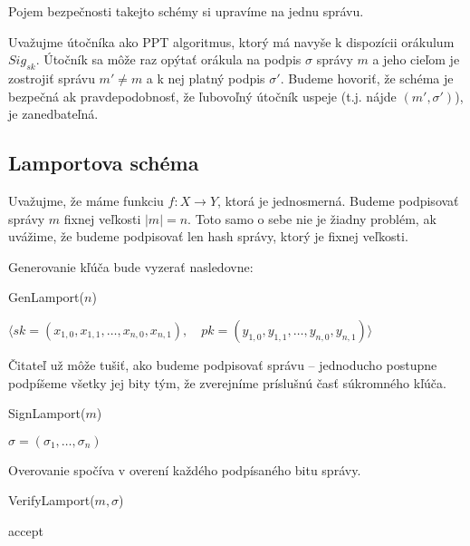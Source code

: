 Pojem bezpečnosti takejto schémy si upravíme na jednu správu.
\begin{definicia}[Bezpečnosť]
    Uvažujme útočníka ako PPT algoritmus, ktorý má navyše k dispozícii
    orákulum $Sig_{sk}$. Útočník sa môže raz opýtať orákula na podpis
    $\sigma$ správy $m$ a jeho cieľom je zostrojiť
    správu $m' \ne m$ a k nej platný podpis $\sigma'$.
    Budeme hovoriť, že schéma je bezpečná ak pravdepodobnosť,
    že ľubovoľný útočník uspeje (t.j. nájde $(m',\sigma')$), je zanedbateľná.
\end{definicia}

\subsection{Lamportova schéma}

Uvažujme, že máme funkciu $f: X \rightarrow Y$, ktorá je jednosmerná.
Budeme podpisovať správy $m$ fixnej veľkosti $|m|=n$. Toto samo o sebe nie
je žiadny problém, ak uvážime, že budeme podpisovať len hash správy, ktorý je
fixnej veľkosti.

Generovanie kľúča bude vyzerať nasledovne:

\begin{procedure}[H]
    \caption{GenLamport($n$)}
    \Return $\langle sk=(x_{1,0},x_{1,1},\ldots,x_{n,0},x_{n,1}),\quad
             pk=(y_{1,0},y_{1,1},\ldots,y_{n,0},y_{n,1}) \rangle$\;
\end{procedure}

Čitateľ už môže tušiť, ako budeme podpisovať správu -- jednoducho postupne
podpíšeme všetky jej bity tým, že zverejníme príslušnú časť súkromného
kľúča.

\begin{procedure}[H]
    \caption{SignLamport($m$)}
    \Return $\sigma = (\sigma_1, \ldots, \sigma_n)$
\end{procedure}

Overovanie spočíva v overení každého podpísaného bitu správy.

\begin{procedure}[H]
    \caption{VerifyLamport($m, \sigma$)}
    \Return accept\;
\end{procedure}

